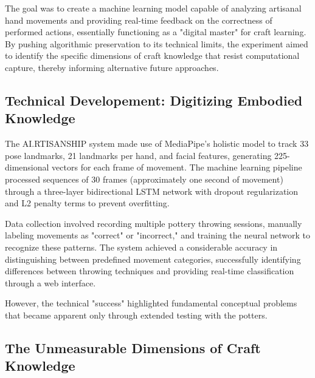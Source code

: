 \vspace{0.5cm}

The goal was to create a machine learning model capable of analyzing artisanal hand movements and providing real-time feedback on the correctness of performed actions, essentially functioning as a "digital master" for craft learning. By pushing algorithmic preservation to its technical limits, the experiment aimed to identify the specific dimensions of craft knowledge that resist computational capture, thereby informing alternative future approaches.












\subsection{Technical Developement: Digitizing Embodied Knowledge}

The AI.RTISANSHIP system made use of MediaPipe's holistic model to track 33 pose landmarks, 21 landmarks per hand, and facial features, generating 225-dimensional vectors for each frame of movement. The machine learning pipeline processed sequences of 30 frames (approximately one second of movement) through a three-layer bidirectional LSTM network with dropout regularization and L2 penalty terms to prevent overfitting.

\vspace{0.5cm}

Data collection involved recording multiple pottery throwing sessions, manually labeling movements as "correct" or "incorrect," and training the neural network to recognize these patterns. The system achieved a considerable accuracy in distinguishing between predefined movement categories, successfully identifying differences between throwing techniques and providing real-time classification through a web interface.

\vspace{0.5cm}

However, the technical "success" highlighted fundamental conceptual problems that became apparent only through extended testing with the potters.








\subsection{The Unmeasurable Dimensions of Craft Knowledge}

